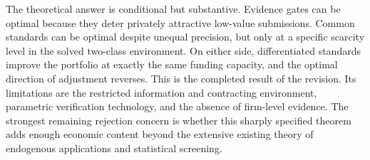 \documentclass[
  11pt,
]{article}
\begin{document}
The theoretical answer is conditional but substantive. Evidence gates
can be optimal because they deter privately attractive low-value
submissions. Common standards can be optimal despite unequal precision,
but only at a specific scarcity level in the solved two-class
environment. On either side, differentiated standards improve the
portfolio at exactly the same funding capacity, and the optimal
direction of adjustment reverses. This is the completed result of the
revision. Its limitations are the restricted information and contracting
environment, parametric verification technology, and the absence of
firm-level evidence. The strongest remaining rejection concern is
whether this sharply specified theorem adds enough economic content
beyond the extensive existing theory of endogenous applications and
statistical screening.
\end{document}
